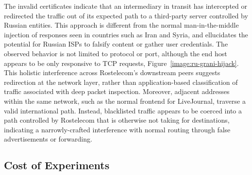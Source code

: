 The invalid certificates indicate that an intermediary in transit has
intercepted or redirected the traffic out of its expected path to a third-party
server controlled by Russian entities. This approach is different from the
normal man-in-the-middle injection of responses seen in countries such as Iran and Syria, and
ellucidates the potential for Russian ISPs to falsify content or gather user
credentials. The observed behavior is not limited to protocol or port, although the end
host appears to be only responsive to TCP requests,
Figure~\ref{image:ru-grani-hijack}. This holistic interference across Rostelecom's downstream peers suggests
redirection at the network layer, rather than application-based classification of traffic associated with deep packet inspection. Moreover,
adjacent addresses within the same network, such as the normal frontend for
LiveJournal, traverse a valid international path. Instead, blacklisted traffic
appears to be coerced into a path controlled by Rostelecom that is otherwise
not taking for destinations, indicating a narrowly-crafted interference with
normal routing through false advertisements or forwarding.

\subsection{Cost of Experiments}
